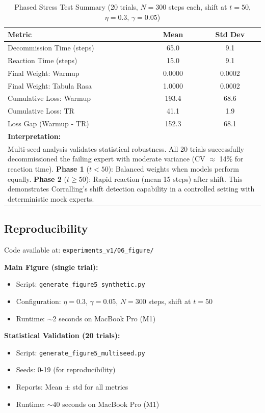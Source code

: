 \begin{table}[t]
\centering
\caption{Phased Stress Test Summary (20 trials, $N=300$ steps each, shift at $t=50$, $\eta=0.3$, $\gamma=0.05$)}
\label{tab:corralling_summary}
\begin{tabular}{lcc}
\toprule
\textbf{Metric} & \textbf{Mean} & \textbf{Std Dev} \\
\midrule
Decommission Time (steps) & 65.0 & 9.1 \\
Reaction Time (steps) & 15.0 & 9.1 \\
Final Weight: Warmup & 0.0000 & 0.0002 \\
Final Weight: Tabula Rasa & 1.0000 & 0.0002 \\
Cumulative Loss: Warmup & 193.4 & 68.6 \\
Cumulative Loss: TR & 41.1 & 1.9 \\
Loss Gap (Warmup - TR) & 152.3 & 68.1 \\
\midrule
\multicolumn{3}{l}{\textbf{Interpretation:}} \\
\multicolumn{3}{p{0.45\textwidth}}{Multi-seed analysis validates statistical robustness. All 20 trials successfully decommissioned the failing expert with moderate variance (CV $\approx$ 14\% for reaction time). \textbf{Phase 1} ($t<50$): Balanced weights when models perform equally. \textbf{Phase 2} ($t\geq50$): Rapid reaction (mean 15 steps) after shift. This demonstrates Corralling's shift detection capability in a controlled setting with deterministic mock experts.} \\
\bottomrule
\end{tabular}
\end{table}

\subsection{Reproducibility}

Code available at: \texttt{experiments\_v1/06\_figure/}

\textbf{Main Figure (single trial):}
\begin{itemize}
    \item Script: \texttt{generate\_figure5\_synthetic.py}
    \item Configuration: $\eta=0.3$, $\gamma=0.05$, $N=300$ steps, shift at $t=50$
    \item Runtime: $\sim$2 seconds on MacBook Pro (M1)
\end{itemize}

\textbf{Statistical Validation (20 trials):}
\begin{itemize}
    \item Script: \texttt{generate\_figure5\_multiseed.py}
    \item Seeds: 0-19 (for reproducibility)
    \item Reports: Mean $\pm$ std for all metrics
    \item Runtime: $\sim$40 seconds on MacBook Pro (M1)
\end{itemize}

